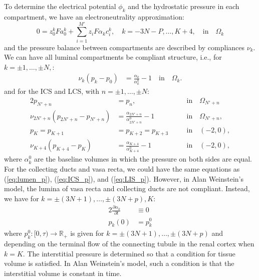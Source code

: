 \documentclass{article}
\begin{document}
To determine the electrical potential $\phi_k$ and the hydrostatic pressure in each compartment, we have an electroneutrality approximation:
\begin{equation}
    0=z_0^k Fa_0^k+\sum_{i=1}^{M'}z_iF \alpha_k c_i^k,\quad k=-3N-P,\dots,K+4,\quad\text{in}\quad \Omega_k
\end{equation}
and the pressure balance between compartments are described by compliances $\nu_k$.
We can have all luminal compartments be compliant structure, i.e., for $k=\pm 1,\dots,\pm N,$:
\begin{align}
    \nu_k(p_k - p_0) &= \frac{\alpha_k}{\alpha_k^0}-1\quad\text{in}\quad\Omega_k.\label{eq:lumen_p}
\end{align}
and for the ICS and LCS, with $n=\pm 1,\dots,\pm N$:
\begin{alignat}{2}
    p_{N'+n} &= p_n,\quad &&\text{in}\quad\Omega_{N'+n}\label{eq:ICS_p} \\ 
    \nu_{2N'+n}(p_{2N'+n} - p_{N'+n}) &= \frac{\alpha_{2N'+n}}{\alpha_{2N'+n}^0}-1\quad &&\text{in}\quad\Omega_{N'+n},\label{eq:LIS_p}\\
    p_K=p_{K+1}&=p_{K+2}=p_{K+3}\quad &&\text{in}\quad (-2,0),\\
    \nu_{K+4}(p_{K+4} - p_{K}) &= \frac{\alpha_{K+4}}{\alpha_{K+4}^0}-1\quad &&\text{in}\quad (-2,0),
\end{alignat}
where $\alpha_k^0$ are the baseline volumes in which the pressure on both sides are equal.
For the collecting ducts and vasa recta, we could have the same equations as (\ref{eq:lumen_p}), (\ref{eq:ICS_p}), and (\ref{eq:LIS_p}).
However, in Alan Weinstein's model, the lumina of vasa recta and collecting ducts are not compliant.
Instead, we have for $k=\pm (3N+1),\dots,\pm(3N+p), K$:
\begin{alignat}{2}
    \frac{\partial\alpha_k}{\partial t}&\equiv 0\\
    p_k(0) &= p_k^0
\end{alignat}
    where $p_k^0:[0,\tau)\to \mathbb{R}_+$ is given for $k=\pm (3N+1),\dots,\pm(3N+p)$ and depending on the terminal flow of the connecting tubule in the renal cortex when $k=K$.
The interstitial pressure is determined so that a condition for tissue volume is satisfied.
In Alan Weinstein's model, such a condition is that the interstitial volume is constant in time.
\end{document}
